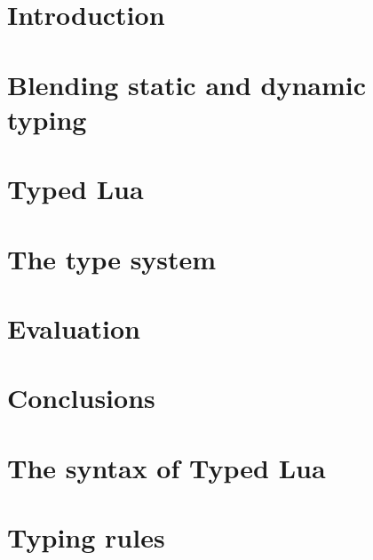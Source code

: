 \documentclass[pdftex,12pt,a4paper]{report}
\begin{document}
\chapter{Introduction}
\label{chap:intro}


\chapter{Blending static and dynamic typing}
\label{chap:review}


\chapter{Typed Lua}
\label{chap:typedlua}


\chapter{The type system}
\label{chap:system}


\chapter{Evaluation}
\label{chap:evaluation}


\chapter{Conclusions}
\label{chap:conc}


\appendix

\chapter{The syntax of Typed Lua}
\label{app:syntax}


\chapter{Typing rules}
\label{app:rules}




\end{document}
